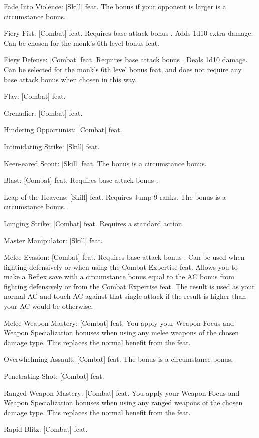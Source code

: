 \begin{itemize*}
\item Fade Into Violence: [Skill] feat. The bonus if your opponent is larger is a circumstance bonus.
\item Fiery Fist: [Combat] feat. Requires base attack bonus . Adds 1d10 extra damage. Can be chosen for the monk's 6th level bonus feat.
\item Fiery \Ki Defense: [Combat] feat. Requires base attack bonus . Deals 1d10 damage. Can be selected for the monk's 6th level bonus feat, and does not require any base attack bonus when chosen in this way.
\item Flay: [Combat] feat.
\item Grenadier: [Combat] feat.
\item Hindering Opportunist: [Combat] feat.
\item Intimidating Strike: [Skill] feat.
\item Keen-eared Scout: [Skill] feat. The bonus is a circumstance bonus.
\item \Ki Blast: [Combat] feat. Requires base attack bonus . 
\item Leap of the Heavens: [Skill] feat. Requires Jump 9 ranks. The bonus is a circumstance bonus.
\item Lunging Strike: [Combat] feat. Requires a standard action.
\item Master Manipulator: [Skill] feat.
\item Melee Evasion: [Combat] feat. Requires base attack bonus . Can be used when fighting defensively or when using the Combat Expertise feat. Allows you to make a Reflex save with a circumstance bonus equal to the AC bonus from fighting defensively or from the Combat Expertise feat. The result is used as your normal AC and touch AC against that single attack if the result is higher than your AC would be otherwise.
\item Melee Weapon Mastery: [Combat] feat. You apply your Weapon Focus and Weapon Specialization bonuses when using any melee weapons of the chosen damage type. This replaces the normal benefit from the feat.
\item Overwhelming Assault: [Combat] feat. The bonus is a circumstance bonus.
\item Penetrating Shot: [Combat] feat.
\item Ranged Weapon Mastery: [Combat] feat. You apply your Weapon Focus and Weapon Specialization bonuses when using any ranged weapons of the chosen damage type. This replaces the normal benefit from the feat.
\item Rapid Blitz: [Combat] feat.

\end{itemize*}
